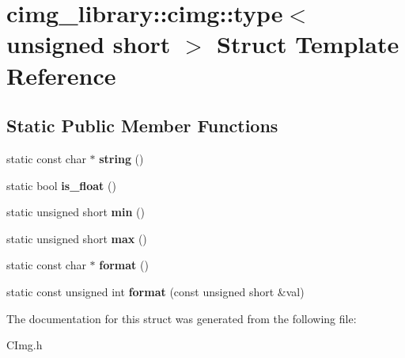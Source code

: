 \hypertarget{structcimg__library_1_1cimg_1_1type_3_01unsigned_01short_01_4}{\section{cimg\-\_\-library\-:\-:cimg\-:\-:type$<$ unsigned short $>$ Struct Template Reference}
\label{structcimg__library_1_1cimg_1_1type_3_01unsigned_01short_01_4}
}
\subsection*{Static Public Member Functions}
\begin{DoxyCompactItemize}
\item 
\hypertarget{structcimg__library_1_1cimg_1_1type_3_01unsigned_01short_01_4_ad6f66e23f0fc2a692ca97caa9499f424}{static const char $\ast$ {\bfseries string} ()}\label{structcimg__library_1_1cimg_1_1type_3_01unsigned_01short_01_4_ad6f66e23f0fc2a692ca97caa9499f424}

\item 
\hypertarget{structcimg__library_1_1cimg_1_1type_3_01unsigned_01short_01_4_a14d5fda4f730cb86296a71ad610a4ce5}{static bool {\bfseries is\-\_\-float} ()}\label{structcimg__library_1_1cimg_1_1type_3_01unsigned_01short_01_4_a14d5fda4f730cb86296a71ad610a4ce5}

\item 
\hypertarget{structcimg__library_1_1cimg_1_1type_3_01unsigned_01short_01_4_a52002e19b832218a771066beefeb3bd4}{static unsigned short {\bfseries min} ()}\label{structcimg__library_1_1cimg_1_1type_3_01unsigned_01short_01_4_a52002e19b832218a771066beefeb3bd4}

\item 
\hypertarget{structcimg__library_1_1cimg_1_1type_3_01unsigned_01short_01_4_acbecd19f66d0da2803720f3055f4b73c}{static unsigned short {\bfseries max} ()}\label{structcimg__library_1_1cimg_1_1type_3_01unsigned_01short_01_4_acbecd19f66d0da2803720f3055f4b73c}

\item 
\hypertarget{structcimg__library_1_1cimg_1_1type_3_01unsigned_01short_01_4_a2ed5e7f015759bbacb4ec4143a670d60}{static const char $\ast$ {\bfseries format} ()}\label{structcimg__library_1_1cimg_1_1type_3_01unsigned_01short_01_4_a2ed5e7f015759bbacb4ec4143a670d60}

\item 
\hypertarget{structcimg__library_1_1cimg_1_1type_3_01unsigned_01short_01_4_ad6c0ad30a117718d259d2f318b7f5a75}{static const unsigned int {\bfseries format} (const unsigned short \&val)}\label{structcimg__library_1_1cimg_1_1type_3_01unsigned_01short_01_4_ad6c0ad30a117718d259d2f318b7f5a75}

\end{DoxyCompactItemize}


The documentation for this struct was generated from the following file\-:\begin{DoxyCompactItemize}
\item 
C\-Img.\-h\end{DoxyCompactItemize}
